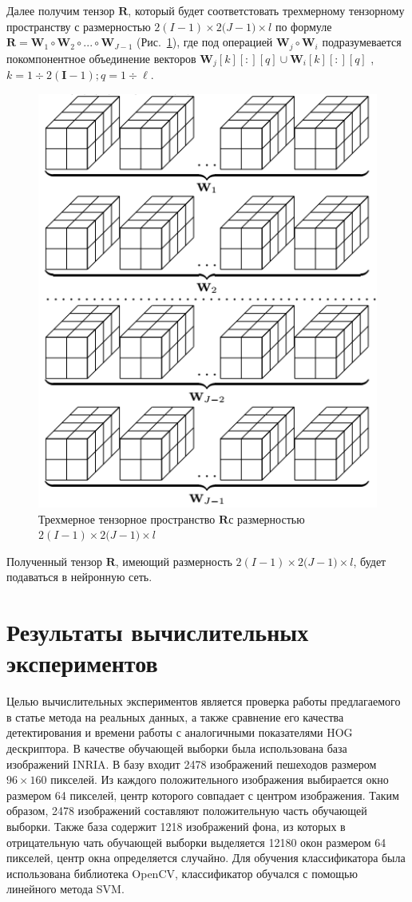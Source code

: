 \documentclass[12pt,twoside]{article}
\begin{document}
Далее получим тензор $\textbf{R}$, который будет соответстовать трехмерному тензорному пространству с размерностью  
${2(I-1)}\times {2(J-1})\times {l}$ по формуле 
$\textbf{R}=\textbf{W}_1 \circ \textbf{W}_2 \circ ... \circ \textbf{W}_{J-1}$
(Рис.~\ref{ris:4}), где под операцией $\textbf{W}_j \circ \textbf{W}_i$ подразумевается покомпонентное объединение векторов $\textbf{W}_{j}[k][:][q] \cup \textbf{W}_i[k][:][q]$ ,  $k=1\div 2(\textbf{I}-1); q=1\div \ell$.
\begin{center}
\begin{figure}[H]
	\includegraphics[width=0.6\linewidth]{4}
	\caption{Трехмерное тензорное пространство $\textbf{R}$с размерностью  ${2(I-1)}\times {2(J-1})\times {l}$}
	\label{ris:4}
\end{figure}

\end{center}
Полученный тензор $\textbf{R}$, имеющий размерность  ${2(I-1)}\times {2(J-1})\times {l}$, будет подаваться в нейронную сеть. 


\section{Результаты вычислительных экспериментов}
Целью вычислительных экспериментов является проверка работы предлагаемого в статье метода на реальных данных, а также сравнение его качества детектирования и времени работы с аналогичными показателями HOG дескриптора.
В качестве обучающей выборки была использована база изображений INRIA. В базу входит 2478 изображений пешеходов размером $96 \times 160$ пикселей.
Из каждого положительного изображения выбирается окно размером 64 пикселей, центр которого совпадает с центром изображения. Таким образом, 2478 изображений составляют положительную часть обучающей выборки.
Также база содержит 1218 изображений фона, из которых в отрицательную чать обучающей выборки выделяется 12180 окон размером 64 пикселей, центр окна определяется случайно.
Для обучения классификатора была использована библиотека OpenCV, классификатор обучался с помощью линейного метода SVM.
\end{document}
